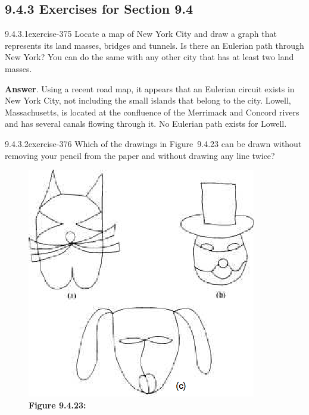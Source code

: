 \documentclass[twoside,10pt,]{book}
\numberwithin{equation}{section}
\begin{document}
\subsection*{9.4.3 Exercises for Section 9.4}
\begin{divisionsolution}{9.4.3.1}{}{exercise-375}%
\hypertarget{p-3261}{}%
Locate a map of New York City and draw a graph that represents its land masses, bridges and tunnels. Is there an Eulerian path through New York? You can do the same with any other city that has at least two land masses.%
\par\smallskip%
\noindent\textbf{Answer}.\quad%
\hypertarget{p-3262}{}%
Using a recent road map, it appears that an Eulerian circuit exists in New York City, not including the small islands that belong to the city. Lowell, Massachusetts, is located at the confluence of the Merrimack and Concord rivers and has several canals flowing through it. No Eulerian path exists for Lowell.%
\end{divisionsolution}%
\begin{divisionsolution}{9.4.3.2}{}{exercise-376}%
\hypertarget{p-3263}{}%
Which of the drawings in Figure~9.4.23 can be drawn without removing your pencil from the paper and without drawing any line twice?%
\begin{figure}
\centering
\includegraphics[width=0.65\linewidth]{images/fig-drawings-9-4.png}
\caption*{\textbf{Figure 9.4.23:} }
\end{figure}
\end{divisionsolution}%
\end{document}

